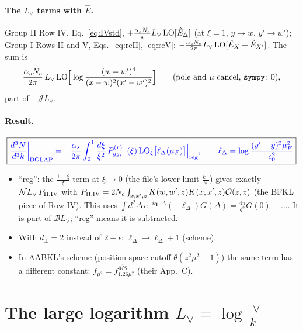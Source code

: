 \documentclass[10pt]{article}
\numberwithin{equation}{section}
\newcommand{\new}[1]{{\color{blue}#1}}
\newcommand{\Lv}{L_{\vee}}
\newcommand{\OO}{\mathcal O}
\newcommand{\JJ}{\mathcal J}
\newcommand{\BB}{\mathcal B}
\newcommand{\NN}{\mathcal N}
\newcommand{\Eh}{\hat E}
\newcommand{\LOx}[1]{{\rm LO}_\xi\big[#1\big]}
\begin{document}
\paragraph{The $\Lv$ terms with $\Eh$.} Group II Row IV, Eq.~\eqref{eq:IVstd}, $+\frac{\alpha_sN_c}{\pi}\Lv\,{\rm LO}[\Eh_\Delta]$ (at $\xi=1$, $y\to w$, $y'\to w'$); Group I Rows II and V, Eqs.~\eqref{eq:rcII}, \eqref{eq:rcV}: $-\frac{\alpha_sN_c}{2\pi}\Lv\,{\rm LO}[\Eh_X+\Eh_{X'}]$. The sum is
\begin{equation*}
\frac{\alpha_sN_c}{2\pi}\,\Lv\,{\rm LO}\Big[\log\frac{(w-w')^4}{(x-w)^2(x'-w')^2}\Big]\qquad(\text{pole and }\mu\text{ cancel, \texttt{sympy}: }0),
\end{equation*}
part of $-\JJ\Lv$.
\paragraph{Result.}
\begin{equation}
\boxed{\new{\frac{d^3N}{d^3k}\bigg|_{\rm DGLAP}=-\frac{\alpha_s}{2\pi}\int_{0}^1\frac{d\xi}{\xi^2}\,P^{(r)}_{gg,+}(\xi)\,\LOx{\ell_\Delta(\mu_F)}\Big|_{\rm reg},\qquad \ell_\Delta=\log\frac{(y'-y)^2\mu_F^2}{c_0^2}}}
\label{eq:dglap}
\end{equation}
\begin{itemize}
\item ``reg'': the $\frac{1-\xi}{\xi}$ term at $\xi\to0$ (the file's lower limit $\frac{k^+}{\vee}$) gives exactly $\NN\Lv\,P_{\rm II.IV}$ with $P_{\rm II.IV}=2N_c\int_{x,x',z}K(w,w',z)K(x,x',z)\OO(z,z)$ (the BFKL piece of Row IV). This uses $\int d^2\Delta\,e^{-i\mathbf q\cdot\Delta}(-\ell_\Delta)G(\Delta)=\frac{4\pi}{q^2}G(0)+\dots$. It is part of $\BB\Lv$; ``reg'' means it is subtracted.
\item With $d_\perp=2$ instead of $2-\epsilon$: $\ell_\Delta\to\ell_\Delta+1$ (scheme).
\item In AABKL's scheme (position-space cutoff $\theta(z^2\mu^2-1)$) the same term has a different constant: $f_{\mu^2}=f^{\overline{MS}}_{1.26\mu^2}$ (their App.~C).
\end{itemize}

\section{The large logarithm \texorpdfstring{$\Lv=\log\frac{\vee}{k^+}$}{log(vee/k+)}}\label{sec:Lv}
\end{document}
